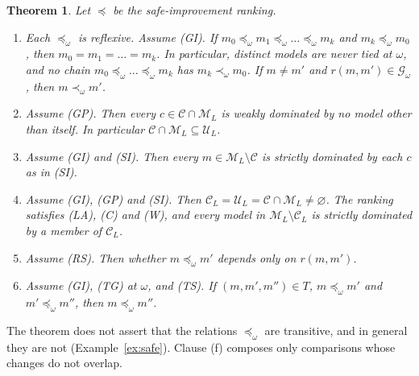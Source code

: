 \documentclass[11pt]{article}
\newtheorem{theorem}{Theorem}[section]
\theoremstyle{definition}
\theoremstyle{remark}
\newcommand{\M}{\mathcal M}
\newcommand{\C}{\mathcal C}
\newcommand{\U}{\mathcal U}
\newcommand{\G}{\mathcal G}
\begin{document}
\begin{theorem}\label{thm:safe}
Let $\preceq$ be the safe-improvement ranking.
\begin{enumerate}[label=(\alph*)]
\item Each $\preceq_\omega$ is reflexive. Assume (GI). If $m_0\preceq_\omega m_1\preceq_\omega\dots\preceq_\omega m_k$ and $m_k\preceq_\omega m_0$, then $m_0=m_1=\dots=m_k$. In particular, distinct models are never tied at $\omega$, and no chain $m_0\preceq_\omega\dots\preceq_\omega m_k$ has $m_k\prec_\omega m_0$. If $m\ne m'$ and $r(m,m')\in\G_\omega$, then $m\prec_\omega m'$.
\item Assume (GP). Then every $c\in\C\cap\M_L$ is weakly dominated by no model other than itself. In particular $\C\cap\M_L\subseteq\U_L$.
\item Assume (GI) and (SI). Then every $m\in\M_L\setminus\C$ is strictly dominated by each $c$ as in (SI).
\item Assume (GI), (GP) and (SI). Then $\C_L=\U_L=\C\cap\M_L\neq\varnothing$. The ranking satisfies (LA), (C) and (W), and every model in $\M_L\setminus\C_L$ is strictly dominated by a member of $\C_L$.
\item Assume (RS). Then whether $m\preceq_\omega m'$ depends only on $r(m,m')$.
\item Assume (GI), (TG) at $\omega$, and (TS). If $(m,m',m'')\in T$, $m\preceq_\omega m'$ and $m'\preceq_\omega m''$, then $m\preceq_\omega m''$.
\end{enumerate}
\end{theorem}
The theorem does not assert that the relations $\preceq_\omega$ are transitive, and in general they are not (Example~\ref{ex:safe}). Clause (f) composes only comparisons whose changes do not overlap.
\end{document}
